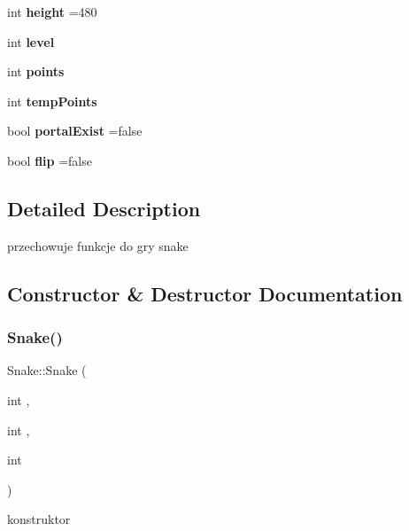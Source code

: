 \begin{DoxyCompactItemize}
\item 
\mbox{\label{class_snake_a094d7065f72f8f2a612ae9a94e1b3ae0}} 
int {\bfseries height} =480
\item 
\mbox{\label{class_snake_af25b4123a2ba882c3c91e0c69597d5dc}} 
int {\bfseries level}
\item 
\mbox{\label{class_snake_a77d9f771bb6cc9b1d5f1e1d3813c4f20}} 
int {\bfseries points}
\item 
\mbox{\label{class_snake_a79ef0cd4238b641d50122a1e0c5be56b}} 
int {\bfseries temp\+Points}
\item 
\mbox{\label{class_snake_accc75a752b47f9f7bb3fd6a2bf00c653}} 
bool {\bfseries portal\+Exist} =false
\item 
\mbox{\label{class_snake_a205f9783faa0a52f044a4564a6e640f4}} 
bool {\bfseries flip} =false
\end{DoxyCompactItemize}


\subsection{Detailed Description}
przechowuje funkcje do gry snake 

\subsection{Constructor \& Destructor Documentation}
\mbox{\label{class_snake_a1a20482bb3288419cb4754644238278d}} 
\subsubsection{\texorpdfstring{Snake()}{Snake()}}
{\footnotesize\ttfamily Snake\+::\+Snake (\begin{DoxyParamCaption}\item[{int}]{,  }\item[{int}]{,  }\item[{int}]{ }\end{DoxyParamCaption})}



konstruktor 


